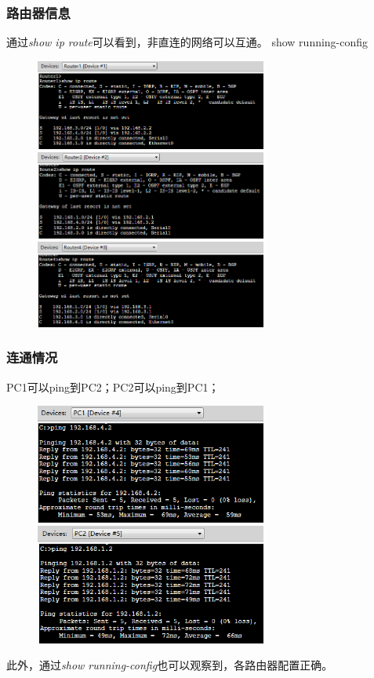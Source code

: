 \documentclass{article}
\begin{document}
\subsubsection{路由器信息}
通过\emph{show ip route}可以看到，非直连的网络可以互通。
show running-config
\begin{figure}[H]
    \centering
    \includegraphics[width=3in]{r1.PNG}
    \includegraphics[width=3in]{r2.PNG}
    \includegraphics[width=3in]{r3.PNG}
\end{figure} 

\subsubsection{连通情况}
PC1可以ping到PC2；PC2可以ping到PC1；
\begin{figure}[H]
    \centering
    \includegraphics[width=3in]{pc1.PNG}
    \includegraphics[width=3in]{pc2.PNG}
\end{figure} 
此外，通过\emph{show running-config}也可以观察到，各路由器配置正确。
\end{document}
